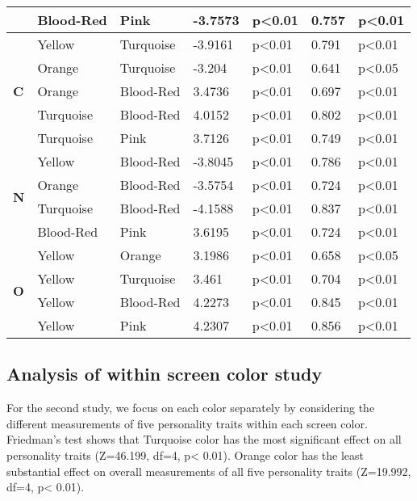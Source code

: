 \begin{longtable}{ |p{0.5cm}| p{1.9cm}|p{1.9cm}|p{1.2cm}| p{1.7cm}|p{1cm}|p{1.5cm}|  }
&Blood-Red	&Pink				&-3.7573			&p<0.01			& 0.757		&p<0.01\\
\hline 
\hline 
\multirow{5}{*}{\textbf{C}} 
&Yellow		&Turquoise			&-3.9161			&p<0.01			&0.791 		&p<0.01\\
&Orange		&Turquoise			&-3.204			&p<0.01			& 0.641		&p<0.05\\
&Orange		&Blood-Red			&3.4736			&p<0.01			&0.697 		&p<0.01\\
&Turquoise	&Blood-Red			&4.0152			&p<0.01			& 0.802		&p<0.01\\
&Turquoise	&Pink				&3.7126			&p<0.01			& 0.749		&p<0.01\\
\hline 
\hline 
\multirow{4}{*}{\textbf{N}} 
&Yellow		&Blood-Red			&-3.8045			&p<0.01			&0.786 		&p<0.01\\
&Orange		&Blood-Red			&-3.5754			&p<0.01			&0.724 		&p<0.01\\
&Turquoise		&Blood-Red		&-4.1588			&p<0.01			&0.837 		&p<0.01\\
&Blood-Red		&Pink			&3.6195			&p<0.01			&0.724 		&p<0.01\\

\hline 
\hline 
\multirow{4}{*}{\textbf{O}} 
&Yellow		&Orange			&3.1986			&p<0.01			&0.658 		&p<0.05\\
&Yellow		&Turquoise			&3.461		&p<0.01			&0.704 		&p<0.01\\
&Yellow		&Blood-Red			&4.2273		&p<0.01			&0.845 		&p<0.01\\
&Yellow		&Pink			&4.2307			&p<0.01			&0.856 		&p<0.01\\
\hline 
\end{longtable}

\subsection{Analysis of within screen color study}
\label{Study2(M-T)}
For the second study, we focus on each color separately by considering the different measurements of five
personality traits within each screen color. Friedman’s test shows that Turquoise color has the most significant
effect on all personality traits (Z=46.199, df=4, p< 0.01). Orange color has the least substantial effect on
overall measurements of all five personality traits (Z=19.992, df=4, p< 0.01).

